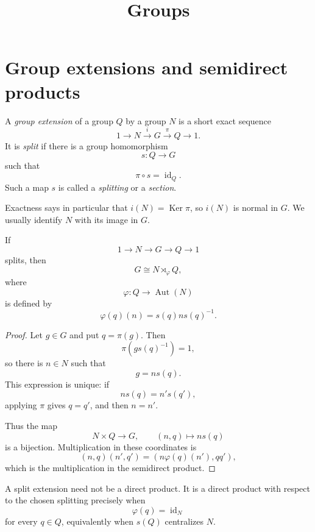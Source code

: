 



\title{Groups}
\maketitle

\label{section-phantom}

\tableofcontents

\section{Group extensions and semidirect
products}
\label{section-group-extensions}

\begin{definition}
\label{definition-group-extension}
A {\it group extension} of a group $Q$ by a
group $N$ is a short exact sequence
$$
1\longrightarrow N
\overset{i}{\longrightarrow}G
\overset{\pi}{\longrightarrow}Q
\longrightarrow1.
$$
It is {\it split} if there is a group
homomorphism
$$
s:Q\longrightarrow G
$$
such that
$$
\pi\circ s=\operatorname{id}_Q.
$$
Such a map $s$ is called a {\it splitting}
or a {\it section}.
\end{definition}

\noindent
Exactness says in particular that
$i(N)=\operatorname{Ker}\pi$, so $i(N)$ is
normal in $G$. We usually identify $N$ with
its image in $G$.

\begin{proposition}
\label{proposition-split-extension-semidirect}
If
$$
1\longrightarrow N
\longrightarrow G
\longrightarrow Q
\longrightarrow1
$$
splits, then
$$
G\cong N\rtimes_\varphi Q,
$$
where
$$
\varphi:Q\longrightarrow
\operatorname{Aut}(N)
$$
is defined by
$$
\varphi(q)(n)=s(q)ns(q)^{-1}.
$$
\end{proposition}

\begin{proof}
Let $g\in G$ and put $q=\pi(g)$. Then
$$
\pi(gs(q)^{-1})=1,
$$
so there is $n\in N$ such that
$$
g=ns(q).
$$
This expression is unique: if
$$
ns(q)=n's(q'),
$$
applying $\pi$ gives $q=q'$, and then
$n=n'$.

Thus the map
$$
N\times Q\longrightarrow G,
\qquad
(n,q)\longmapsto ns(q)
$$
is a bijection. Multiplication in these
coordinates is
$$
(n,q)(n',q')
=
(n\varphi(q)(n'),qq'),
$$
which is the multiplication in the
semidirect product.
\end{proof}

\begin{remark}
\label{remark-split-not-direct}
A split extension need not be a direct
product. It is a direct product with respect
to the chosen splitting precisely when
$$
\varphi(q)=\operatorname{id}_N
$$
for every $q\in Q$, equivalently when
$s(Q)$ centralizes $N$.
\end{remark}

